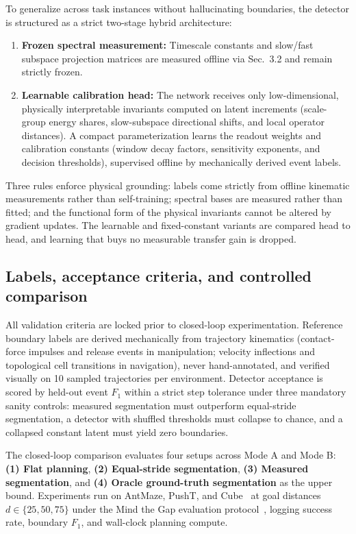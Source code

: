 \documentclass[11pt]{article}
\begin{document}
To generalize across task instances without hallucinating boundaries, the detector is structured as a strict two-stage hybrid architecture:
\begin{enumerate}[leftmargin=*, nosep]
    \item \textbf{Frozen spectral measurement:} Timescale constants and slow/fast subspace projection matrices are measured offline via Sec.~3.2 and remain strictly frozen.
    \item \textbf{Learnable calibration head:} The network receives only low-dimensional, physically interpretable invariants computed on latent increments (scale-group energy shares, slow-subspace directional shifts, and local operator distances). A compact parameterization learns the readout weights and calibration constants (window decay factors, sensitivity exponents, and decision thresholds), supervised offline by mechanically derived event labels.
\end{enumerate}
Three rules enforce physical grounding: labels come strictly from offline kinematic measurements rather than self-training; spectral bases are measured rather than fitted; and the functional form of the physical invariants cannot be altered by gradient updates. The learnable and fixed-constant variants are compared head to head, and learning that buys no measurable transfer gain is dropped.

\subsection{Labels, acceptance criteria, and controlled comparison}

All validation criteria are locked prior to closed-loop experimentation. Reference boundary labels are derived mechanically from trajectory kinematics (contact-force impulses and release events in manipulation; velocity inflections and topological cell transitions in navigation), never hand-annotated, and verified visually on 10 sampled trajectories per environment. Detector acceptance is scored by held-out event $F_1$ within a strict step tolerance under three mandatory sanity controls: measured segmentation must outperform equal-stride segmentation, a detector with shuffled thresholds must collapse to chance, and a collapsed constant latent must yield zero boundaries.

The closed-loop comparison evaluates four setups across Mode A and Mode B: \textbf{(1) Flat planning}, \textbf{(2) Equal-stride segmentation}, \textbf{(3) Measured segmentation}, and \textbf{(4) Oracle ground-truth segmentation} as the upper bound. Experiments run on AntMaze, PushT, and Cube~\cite{hjepa2026} at goal distances $d \in \{25, 50, 75\}$ under the Mind the Gap evaluation protocol~\cite{mindthegap2026}, logging success rate, boundary $F_1$, and wall-clock planning compute.
\end{document}
